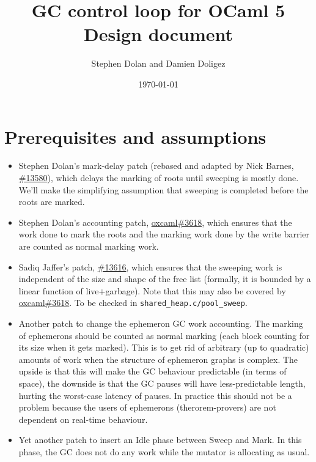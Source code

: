 \documentclass{article}
\begin{document}
\title{GC control loop for OCaml 5\\
Design document}
\author{Stephen Dolan and Damien Doligez}
\date{\today}


\maketitle

\section{Prerequisites and assumptions}
\label{prerequisites}

\begin{itemize}
\item[\Checkmark] Stephen Dolan's mark-delay patch (rebased and adapted by Nick
Barnes, \href{https://github.com/ocaml/ocaml/pull/13580}{\#13580}),
which delays the marking of roots until sweeping is mostly done. We'll
make the simplifying assumption that sweeping is completed before the
roots are marked.
\item Stephen Dolan's accounting patch,
\href{https://github.com/oxcaml/oxcaml/pull/3618}{oxcaml\#3618}, which
ensures that the work done to mark the roots and the marking work done by the
write barrier are counted as normal marking work.
\item[\Checkmark] Sadiq Jaffer's patch,
\href{https://github.com/ocaml/ocaml/pull/13616}{\#13616}, which ensures that
the sweeping work is independent of the size and shape of the free
list (formally, it is bounded by a linear function of
live$+$garbage). Note that this may also be covered by
\href{https://github.com/oxcaml/oxcaml/pull/3618}{oxcaml\#3618}. To
be checked in \verb'shared_heap.c/pool_sweep'.
\item Another patch to change the ephemeron GC work accounting. The
marking of ephemerons should be counted as normal marking (each block
counting for its size when it gets marked). This is to get rid of
arbitrary (up to quadratic) amounts of work when the structure of
ephemeron graphs is complex. The upside is that this will make the GC
behaviour predictable (in terms of space), the downside is that the GC
pauses will have less-predictable length, hurting the worst-case
latency of pauses. In practice this should not be a problem because
the users of ephemerons (therorem-provers) are not dependent on
real-time behaviour.
\item Yet another patch to insert an Idle phase between Sweep and
Mark. In this phase, the GC does not do any work while the mutator is
allocating as usual.
\end{itemize}
\end{document}

